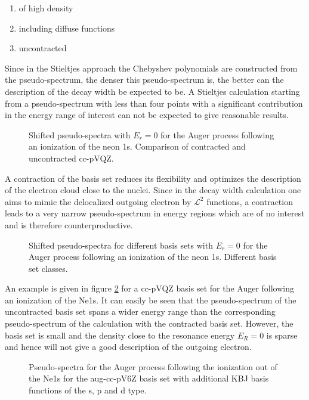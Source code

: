 \begin{enumerate}
 \item of high density
 \item including diffuse functions
 \item uncontracted
\end{enumerate}
Since in the Stieltjes approach the Chebyshev polynomials are constructed from
the pseudo-spectrum, the denser this pseudo-spectrum is, the better can the
description of the decay width be expected to be. A Stieltjes calculation starting
from a pseudo-spectrum with less than four points with a significant contribution
in the energy range of interest can not be expected to give reasonable results.

\begin{figure}[ht]
  \centering
  
  \caption{Shifted pseudo-spectra with $E_r=0$
           for the Auger process following an ionization of the neon 1s.
           Comparison of contracted and uncontracted cc-pVQZ.}
  \label{figure:bases_pseudospectra}
\end{figure}

A contraction of the basis set reduces its flexibility and optimizes the
description of the electron cloud close to the nuclei. Since in the decay width
calculation one aims to mimic the delocalized outgoing electron by
$\mathcal{L}^2$ functions, a contraction leads to a very narrow pseudo-spectrum
in energy regions which are of no interest and is therefore counterproductive.

\begin{figure}[ht]
  \centering
  
  \caption{Shifted pseudo-spectra for different basis sets with $E_r=0$
           for the Auger process following an ionization of the neon 1s.
           Different basis set classes.}
  \label{figure:bases_pseudospectra}
\end{figure}

An example is given in figure \ref{figure:bases_pseudospectra} for a cc-pVQZ
basis set for the Auger following an ionization of the Ne1s.
It can easily be seen that the pseudo-spectrum of the uncontracted basis set spans
a wider energy range than the corresponding pseudo-spectrum of the calculation with
the contracted basis set.
However, the basis set is small and the density close to the resonance energy
$E_R=0$ is sparse and hence will not give a good description of the outgoing
electron.

\begin{figure}[ht]
  \centering
  
  \caption{Pseudo-spectra for the Auger process following the ionization
           out of the Ne1s for the aug-cc-pV6Z basis set with additional
           \ac{KBJ} basis functions of the s, p and d type.}
  \label{figure:bases_jungen}
\end{figure}

